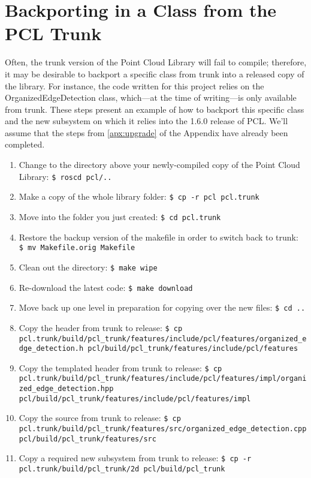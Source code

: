 \documentclass[12pt]{report}
\begin{document}
\section{Backporting in a Class from the PCL Trunk}
Often, the trunk version of the Point Cloud Library will fail to compile; therefore, it may be desirable to backport a specific class from trunk into a released copy of the library.  For instance, the code written for this project relies on the OrganizedEdgeDetection class, which---at the time of writing---is only available from trunk.  These steps present an example of how to backport this specific class and the new subsystem on which it relies into the 1.6.0 release of PCL.  We'll assume that the steps from \autoref{apx:upgrade} of the Appendix have already been completed.
\begin{enumerate}
\item{Change to the directory above your newly-compiled copy of the Point Cloud Library: \texttt{\$\ roscd pcl/..}}
\item{Make a copy of the whole library folder: \texttt{\$\ cp -r pcl pcl.trunk}}
\item{Move into the folder you just created: \texttt{\$\ cd pcl.trunk}}
\item{Restore the backup version of the makefile in order to switch back to trunk: \texttt{\$\ mv Makefile.orig Makefile}}
\item{Clean out the directory: \texttt{\$\ make wipe}}
\item{Re-download the latest code: \texttt{\$\ make download}}
\item{Move back up one level in preparation for copying over the new files: \texttt{\$\ cd ..}}
\item{Copy the header from trunk to release: \texttt{\$\ cp pcl.trunk/build/pcl\_trunk/features/include/pcl/features/organized\_edge\_detection.h pcl/build/pcl\_trunk/features/include/pcl/features}}
\item{Copy the templated header from trunk to release: \texttt{\$\ cp pcl.trunk/build/pcl\_trunk/features/include/pcl/features/impl/organized\_edge\_detection.hpp pcl/build/pcl\_trunk/features/include/pcl/features/impl}}
\item{Copy the source from trunk to release: \texttt{\$\ cp pcl.trunk/build/pcl\_trunk/features/src/organized\_edge\_detection.cpp pcl/build/pcl\_trunk/features/src}}
\item{Copy a required new subsystem from trunk to release: \texttt{\$\ cp -r pcl.trunk/build/pcl\_trunk/2d pcl/build/pcl\_trunk}}

\end{enumerate}
\end{document}
